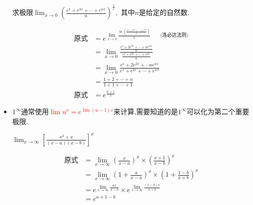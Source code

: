 \documentclass[12pt, a4paper, oneside, UTF8]{ctexbook}  %
\begin{document}
\begin{sloppypar}
\begin{itemize}
              \begin{problem}
              求极限$\lim_{x\to0}\left(\frac{e^x+e^{2x}+\cdots+e^{nx}}n\right)^{\frac{1}{x}},$ 其中$n$是给定的自然数.
              \end{problem}
              \begin{solution}
                  \begin{align*}
                      \text{原式} & = e^{\lim_{x \to 0} \frac{\ln \left(\frac{e^x+e^{2x}+\cdots+e^{nx}}n\right)}{x}\qquad \text{(洛必达法则)} } \\
                                & =\lim_{x\to0}\frac{\frac{e^{x}+2e^{2x}+\cdots+ne^{nx}}{n}}{\frac{e^{x}+e^{2x}+\cdots+e^{nx}}{n}}       \\
                                & = \lim_{x\to0}\frac{e^{x}+2e^{2x}+\cdots ne^{nx}}{e^{x}+e^{2x}+\cdots+e^{nx}}                          \\
                                & =\frac{1+2+\cdots+n}{1+1+\cdots+1}                                                                     \\
                      \text{原式} & = e^{\frac{n+1}{2}}
                  \end{align*}
              \end{solution}
        \item $1 ^ \infty$通常使用\textcolor{red}{$\lim u^v=e^{\lim (u-1)v}$}来计算,需要知道的是$1^\infty$可以化为第二个重要极限.
              \begin{problem}
              $\lim _{x \to \infty}\left[ \frac{x^2 + x}{(x-a)(x-b)}\right]^x$
              \end{problem}
              \begin{solution}
                  \begin{align*}
                      \text{原式} & = \lim _{x \to \infty} \left(\frac{x}{x-a}\right)^x \times \left(\frac{x+1}{x-b}\right)^x         \\
                                & =  \lim _{x \to \infty} \left(1+\frac{a}{x-a} \right)^x \times \left( 1+\frac{1-b}{x+b} \right)^x \\
                                & = e^{\lim _{x \to \infty} \frac{ax}{x-a} } \times e^{\lim _{x \to \infty} \frac{(1-b)x}{x+b}}     \\
                                & =e^{a+1-b}
                  \end{align*}
              \end{solution}
              \begin{problem}

\end{problem}
\end{itemize}
\end{sloppypar}
\end{document}
